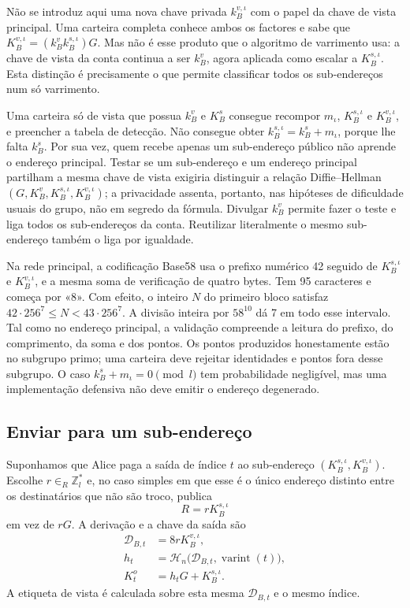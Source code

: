 Não se introduz aqui uma nova chave privada
\(k_B^{v,\iota}\) com o papel da chave de vista principal. Uma carteira
completa conhece ambos os factores e sabe que
\(K_B^{v,\iota}=(k_B^v k_B^{s,\iota})G\). Mas não é esse produto que o
algoritmo de varrimento usa: a chave de vista da conta continua a ser
\(k_B^v\), agora aplicada como escalar a \(K_B^{s,\iota}\). Esta distinção é
precisamente o que permite classificar todos os sub-endereços num só
varrimento.

Uma carteira só de vista que possua \(k_B^v\) e \(K_B^s\) consegue recompor
\(m_\iota\), \(K_B^{s,\iota}\) e \(K_B^{v,\iota}\), e preencher a tabela de
detecção. Não consegue obter
\(k_B^{s,\iota}=k_B^s+m_\iota\), porque lhe falta \(k_B^s\).
Por sua vez, quem recebe apenas um sub-endereço público não aprende o endereço
principal. Testar se um sub-endereço e um endereço principal partilham a
mesma chave de vista exigiria distinguir a relação Diffie--Hellman
\((G,K_B^v,K_B^{s,\iota},K_B^{v,\iota})\); a privacidade assenta, portanto,
nas hipóteses de dificuldade usuais do grupo, não em segredo da fórmula.
Divulgar \(k_B^v\) permite fazer o teste e liga todos os sub-endereços da
conta. Reutilizar literalmente o mesmo sub-endereço também o liga por
igualdade.

%
Na rede principal, a codificação Base58 usa o prefixo numérico 42 seguido de
\(K_B^{s,\iota}\) e \(K_B^{v,\iota}\), e a mesma soma de verificação de quatro
bytes. Tem 95 caracteres e começa por «8». Com efeito, o inteiro \(N\)
do primeiro bloco satisfaz \(42\cdot256^7\leq N<43\cdot256^7\).
A divisão inteira por \(58^{10}\) dá 7 em todo esse intervalo.
Tal como no endereço principal, a validação compreende a leitura do prefixo,
do comprimento, da soma e dos pontos. Os pontos produzidos honestamente estão no
subgrupo primo; uma carteira deve rejeitar identidades e pontos fora desse
subgrupo. O caso
\(k_B^s+m_\iota=0\pmod l\) tem probabilidade negligível, mas uma implementação
defensiva não deve emitir o endereço degenerado.

\subsection{Enviar para um sub-endereço}

Suponhamos que Alice paga a saída de índice \(t\) ao sub-endereço
\((K_B^{s,\iota},K_B^{v,\iota})\). Escolhe
\(r\in_R\mathbb{Z}_l^*\) e, no caso simples em que esse é o único endereço
distinto entre os destinatários que não são troco, publica
\[
 R=rK_B^{s,\iota}
\]
em vez de \(rG\). A derivação e a chave da saída são
\begin{align*}
 \mathcal D_{B,t}&=8rK_B^{v,\iota},\\
 h_t&=\mathcal H_n\bigl(
       \mathcal D_{B,t},\operatorname{varint}(t)\bigr),\\
 K_t^o&=h_tG+K_B^{s,\iota}.
\end{align*}
A etiqueta de vista é calculada sobre esta mesma
\(\mathcal D_{B,t}\) e o mesmo índice.

